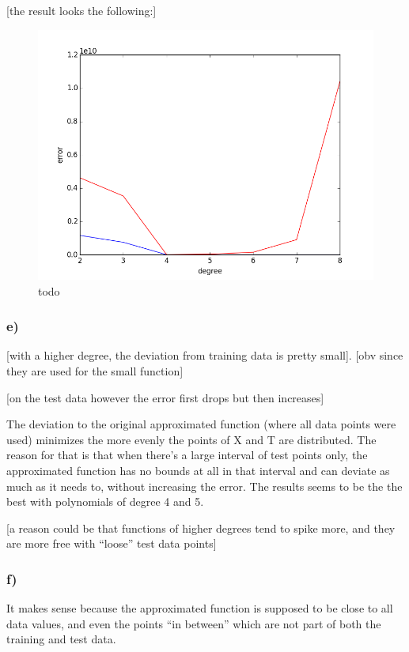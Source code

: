 [the result looks the following:]

\begin{figure}[!ht]
\includegraphics[width=1\textwidth]{chapters/images/figure-5-11-d}
\caption{todo}
\end{figure}


\subsubsection{e)}

[with a higher degree, the deviation from training data is pretty small]. [obv since they are used for the small function]

[on the test data however the error first drops but then increases]

The deviation to the original approximated function (where all data points were used) minimizes the more evenly the points of X and T are distributed. The reason for that is that when there's a large interval of test points only, the approximated function has no bounds at all in that interval and can deviate as much as it needs to, without increasing the error.
The results seems to be the the best with polynomials of degree 4 and 5.

[a reason could be that functions of higher degrees tend to spike more, and they are more free with \enquote{loose} test data points]

\subsubsection{f)}

It makes sense because the approximated function is supposed to be close to all data values, and even the points \enquote{in between} which are not part of both the training and test data.